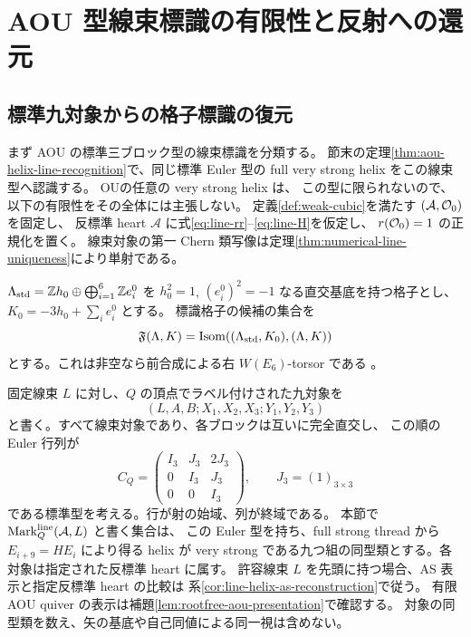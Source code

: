 \section{AOU 型線束標識の有限性と反射への還元}\label{sec:weyl-frame}
\subsection{標準九対象からの格子標識の復元}
まず AOU の標準三ブロック型の線束標識を分類する。
節末の定理\ref{thm:aou-helix-line-recognition}で、同じ標準 Euler 型の
full very strong helix をこの線束型へ認識する。
OU\cite[Definition 1.1(3)]{OU2025}の任意の very strong helix は、
この型に限られないので、以下の有限性をその全体には主張しない。
定義\ref{def:weak-cubic}を満たす $(\mathcal A,\mathcal O_0)$ を固定し、
反標準 heart $\mathcal A$ に式\eqref{eq:line-rr}--\eqref{eq:line-H}を仮定し、
$r(\mathcal O_0)=1$ の正規化を置く。
線束対象の第一 Chern 類写像は定理\ref{thm:numerical-line-uniqueness}により単射である。

$\Lambda_{\rm std}=\mathbb Zh_0\oplus\bigoplus_{i=1}^6\mathbb Ze_i^0$ を
$h_0^2=1$, $(e_i^0)^2=-1$ なる直交基底を持つ格子とし、
$K_0=-3h_0+\sum_i e_i^0$ とする。
標識格子の候補の集合を
\[
 \mathfrak F(\Lambda,K)
 =\operatorname{Isom}((\Lambda_{\rm std},K_0),(\Lambda,K))
\]
とする。これは非空なら前合成による右 $W(E_6)$-torsor である
\cite[\S2.6]{DGK}。

固定線束 $L$ に対し、$Q$ の頂点でラベル付けされた九対象を
\[
 (L,A,B;X_1,X_2,X_3;Y_1,Y_2,Y_3)
\]
と書く。すべて線束対象であり、各ブロックは互いに完全直交し、
この順の Euler 行列が
\begin{equation}\label{eq:frame-euler}
 C_Q=\begin{pmatrix}I_3&J_3&2J_3\\0&I_3&J_3\\0&0&I_3\end{pmatrix},
 \qquad J_3=(1)_{3\times3}
\end{equation}
である標準型を考える。行が射の始域、列が終域である。
本節で $\operatorname{Mark}_Q^{\rm line}(\mathcal A,L)$ と書く集合は、
この Euler 型を持ち、full strong thread から $E_{i+9}=HE_i$ により得る helix が
very strong である九つ組の同型類とする。各対象は指定された反標準 heart に属す。
許容線束 $L$ を先頭に持つ場合、AS 表示と指定反標準 heart の比較は
系\ref{cor:line-helix-as-reconstruction}で従う。
有限 AOU quiver の表示は補題\ref{lem:rootfree-aou-presentation}で確認する。
対象の同型類を数え、矢の基底や自己同値による同一視は含めない。

